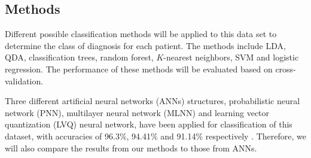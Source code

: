 \documentclass[conference,onecolumn]{IEEEtran}
\begin{document}
\subsection{Methods}
Different possible classification methods will be applied to this data set to determine the class of diagnosis for each patient. The methods include LDA, QDA, classification trees, random forest, $K$-nearest neighbors, SVM and logistic regression. The performance of these methods will be evaluated based on cross-validation. 

Three different artificial neural networks (ANNs) structures, probabilistic
neural network (PNN), multilayer neural network (MLNN) and learning vector quantization (LVQ) neural network, have been applied for classification of this dataset, with accuracies of 96.3\%, 94.41\% and 91.14\% respectively \cite{Er201275}. Therefore, we will also compare the results from our methods to those from ANNs.






\end{document}
